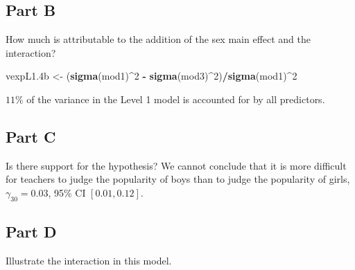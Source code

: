 \documentclass[]{article}
\newenvironment{Shaded}{\begin{snugshade}}{\end{snugshade}}
\newcommand{\KeywordTok}[1]{\textcolor[rgb]{0.13,0.29,0.53}{\textbf{#1}}}
\newcommand{\DecValTok}[1]{\textcolor[rgb]{0.00,0.00,0.81}{#1}}
\newcommand{\StringTok}[1]{\textcolor[rgb]{0.31,0.60,0.02}{#1}}
\newcommand{\OperatorTok}[1]{\textcolor[rgb]{0.81,0.36,0.00}{\textbf{#1}}}
\newcommand{\NormalTok}[1]{#1}
\begin{document}
\subsection{Part B}\label{part-b-3}

How much is attributable to the addition of the sex main effect and the
interaction?

\begin{Shaded}
\begin{Highlighting}[]
\NormalTok{vexpL1.4b <-}\StringTok{ }\NormalTok{(}\KeywordTok{sigma}\NormalTok{(mod1)}\OperatorTok{^}\DecValTok{2} \OperatorTok{-}\StringTok{ }\KeywordTok{sigma}\NormalTok{(mod3)}\OperatorTok{^}\DecValTok{2}\NormalTok{)}\OperatorTok{/}\KeywordTok{sigma}\NormalTok{(mod1)}\OperatorTok{^}\DecValTok{2}
\end{Highlighting}
\end{Shaded}

\(11\)\% of the variance in the Level 1 model is accounted for by all
predictors.

\subsection{Part C}\label{part-c-2}

Is there support for the hypothesis? We cannot conclude that it is more
difficult for teachers to judge the popularity of boys than to judge the
popularity of girls, \(\gamma_{30} = 0.03\), 95\% CI \([0.01, 0.12]\).

\subsection{Part D}\label{part-d-2}

Illustrate the interaction in this model.
\end{document}
